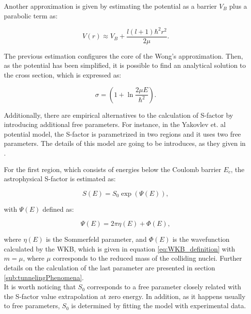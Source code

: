 \documentclass[openany]{book}
\begin{document}
Another approximation is given by estimating the potential as a barrier $V_B$ plus a parabolic term as:

\begin{equation} \label{eq:potential_WKB_potential_Wong}
	V(r) \approx V_B + \frac{l(l+1) \hbar^2  r^2 }{2\mu}.
\end{equation}

The previous estimation configures the core of the Wong's approximation. Then, as the potential has been simplified, it is possible to find an analytical solution to the cross section, which is expressed as: 

\begin{equation} \label{eq:potential_WKB_crossSection_Wong}
	\sigma = \left( 1 + \ln{\frac{2\mu E}{\hbar ^2}} \right).
\end{equation}

Additionally, there are empirical alternatives to the calculation of S-factor by introducing additional free parameters. For instance, in the Yakovlev et. al potential model, the S-factor is parametrized in two regions and it uses two free parameters.  The details of this model are going to be introduces, as they given in \cite{yakovlev_beard_gasques_wiescher_2010}. 

For the first region, which consists of energies below the Coulomb barrier $E_c$, the astrophysical S-factor is estimated as:

\begin{equation}  \label{eq:potential_Yakovlev_sfactor_belowBarrier}
	S(E) = S_0 \exp ({\Psi(E)} ),
\end{equation}

with $\Psi(E)$ defined as: 

\begin{equation}  \label{eq:potential_Yakovlev_psiWKB}
	\Psi(E) = 2\pi\eta(E) + \Phi(E),
\end{equation}

where $\eta(E)$ is the Sommerfeld parameter, and $\Phi(E)$ is the wavefunction calculated by the WKB, which is given in equation \ref{eq:WKB_definition} with $m = \mu$, where $\mu$ corresponds to the reduced mass of the colliding nuclei. Further details on the calculation of the last parameter are presented in section \ref{sub:tunnelingPhenomena}. \\

It is worth noticing that $S_0$ corresponds to a free parameter closely related with the S-factor value extrapolation at zero energy. In addition, as it happens usually to free parameters, $S_0$ is determined by fitting the model with experimental data. \\
\end{document}

